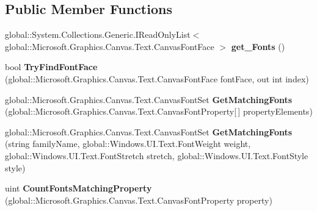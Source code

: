 \subsection*{Public Member Functions}
\begin{DoxyCompactItemize}
\item 
\mbox{\label{interface_microsoft_1_1_graphics_1_1_canvas_1_1_text_1_1_i_canvas_font_set_a3127f9ceaa2e85c1d6dc30f5eae2eb02}} 
global\+::\+System.\+Collections.\+Generic.\+I\+Read\+Only\+List$<$ global\+::\+Microsoft.\+Graphics.\+Canvas.\+Text.\+Canvas\+Font\+Face $>$ {\bfseries get\+\_\+\+Fonts} ()
\item 
\mbox{\label{interface_microsoft_1_1_graphics_1_1_canvas_1_1_text_1_1_i_canvas_font_set_aa2c30125a6ebce4c37256a8c0277ff6a}} 
bool {\bfseries Try\+Find\+Font\+Face} (global\+::\+Microsoft.\+Graphics.\+Canvas.\+Text.\+Canvas\+Font\+Face font\+Face, out int index)
\item 
\mbox{\label{interface_microsoft_1_1_graphics_1_1_canvas_1_1_text_1_1_i_canvas_font_set_a32b02ae8a2da14f8f1cfa1cc5d6002b3}} 
global\+::\+Microsoft.\+Graphics.\+Canvas.\+Text.\+Canvas\+Font\+Set {\bfseries Get\+Matching\+Fonts} (global\+::\+Microsoft.\+Graphics.\+Canvas.\+Text.\+Canvas\+Font\+Property\mbox{[}$\,$\mbox{]} property\+Elements)
\item 
\mbox{\label{interface_microsoft_1_1_graphics_1_1_canvas_1_1_text_1_1_i_canvas_font_set_ade4753638611bbb574a4ebc50e68e70e}} 
global\+::\+Microsoft.\+Graphics.\+Canvas.\+Text.\+Canvas\+Font\+Set {\bfseries Get\+Matching\+Fonts} (string family\+Name, global\+::\+Windows.\+U\+I.\+Text.\+Font\+Weight weight, global\+::\+Windows.\+U\+I.\+Text.\+Font\+Stretch stretch, global\+::\+Windows.\+U\+I.\+Text.\+Font\+Style style)
\item 
\mbox{\label{interface_microsoft_1_1_graphics_1_1_canvas_1_1_text_1_1_i_canvas_font_set_a1def5cacbe2bad80bc122419229c2640}} 
uint {\bfseries Count\+Fonts\+Matching\+Property} (global\+::\+Microsoft.\+Graphics.\+Canvas.\+Text.\+Canvas\+Font\+Property property)

\end{DoxyCompactItemize}
